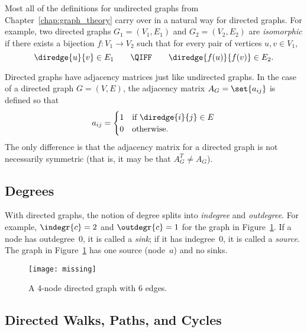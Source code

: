 Most all of the definitions for undirected graphs from
Chapter~\ref{chap:graph_theory} carry over in a natural way for
directed graphs.  For example, two directed graphs $G_1 = (V_1, E_1)$
and $G_2 = (V_2, E_2)$ are \emph{isomorphic} if there exists a
bijection $f: V_1 \to V_2$ such that for every pair of vertices $u, v
\in V_1$,
\begin{equation*}
    \diredge{u}{v} \in E_1 \qquad \QIFF \qquad \diredge{f(u)}{f(v)} \in E_2.
\end{equation*}

Directed graphs have adjacency matrices just like undirected graphs.
In the case of a directed graph $G = (V, E)$, the adjacency matrix
$A_G = \set{ a_{ij} }$ is defined so that
\begin{equation*}
    a_{ij} = \begin{cases}
                1 & \text{if $\diredge{i}{j} \in E$} \\
                0 & \text{otherwise.}
              \end{cases}
\end{equation*}
The only difference is that the adjacency matrix for a directed graph
is not necessarily symmetric (that is, it may be that
$A_{G}^{T} \ne A_G$).

\subsection{Degrees}

With directed graphs, the notion of degree splits into \emph{indegree}
and \emph{outdegree}.  For example, $\indegr{c} = 2$ and $\outdegr{c}
= 1$ for the graph in Figure~\ref{fig:6EB}.  If a node has
outdegree~0, it is called a \emph{sink}; if it has indegree~0, it is
called a \emph{source}.  The graph in Figure~\ref{fig:6EB} has one
source (node~$a$) and no sinks.

\begin{figure}


\texttt{[image: missing]}

\caption{A 4-node directed graph with 6 edges.}

\label{fig:6EB}

\end{figure}

\subsection{Directed Walks, Paths, and Cycles}

